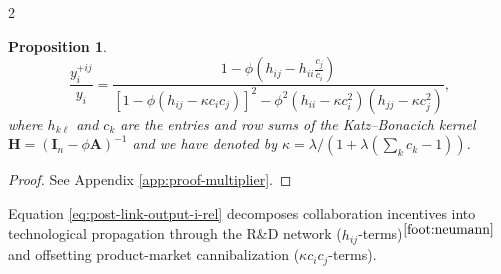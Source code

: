 \documentclass[12pt]{article}
\newtheorem{proposition}[claim]{Proposition}
\begin{document}
\begin{spacing}{2}
\begin{proposition}
\begin{equation}
\frac{y_i^{+ij}}{y_i} = \frac{1 - \phi \left( h_{ij} - h_{ii}\frac{c_j}{c_i} \right)}{\left[ 1 - \phi \left( h_{ij} - \kappa c_i c_j \right) \right]^2 - \phi^2 \left( h_{ii} - \kappa c_i^2 \right) \left( h_{jj} - \kappa c_j^2 \right)},
\label{eq:post-link-output-i-rel}
\end{equation}
where $h_{k\ell}$ and $c_k$ are the entries and row sums of the Katz--Bonacich kernel $\mathbf{H} = (\mathbf{I}_n - \phi \mathbf{A})^{-1}$ and we have denoted by $\kappa = \lambda /(1+\lambda\left(\sum_k c_k-1\right))$. 
\end{proposition}
\begin{proof}
See Appendix \ref{app:proof-multiplier}.
\end{proof}
\noindent Equation \eqref{eq:post-link-output-i-rel} decomposes collaboration incentives into technological propagation through the R\&D network
($h_{ij}$-terms)${}^{\ref{foot:neumann}}$ and offsetting product-market cannibalization ($\kappa c_i c_j$-terms). 


\end{spacing}
\end{document}
